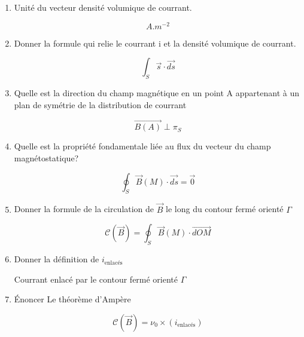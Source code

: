 \begin{enumerate}[label=\arabic{enumi} - , left=0pt, itemsep=1em]
    \item Unité du vecteur densité volumique de courrant.\par
    \begin{solution}
         \[ A.m^{-2} \]
    \end{solution}

    \item Donner la formule qui relie le courrant i et la densité volumique de courrant.\par
    \begin{solution}
         \[ \int_S \vec{s} \cdot \vec{ds} \]
    \end{solution}

    \item Quelle est la direction du champ magnétique en un point A appartenant à un plan de symétrie de la distribution de courrant  \par
    \begin{solution}
         \[ \vec{B(A)} \perp \pi_S \]
    \end{solution}


    \item Quelle est la propriété fondamentale liée au flux du vecteur du champ magnétostatique?\par 
    \begin{solution}
         \[ \oint_S \vec{B}(M) \cdot \vec{ds} = \vec{0} \]
    \end{solution}

    \item Donner la formule de la circulation de $\vec{B}$ le long du contour fermé orienté $\Gamma$\par
    \begin{solution}
         \[ \mathscr{C}(\vec{B}) = \oint_S \vec{B}(M) \cdot \vec{dOM} \]
    \end{solution}

    \item Donner la définition de $i_{\text{enlacés}}$ \par
    \begin{solution}
         Courrant enlacé par le contour fermé orienté $\Gamma$
    \end{solution}

    \item Énoncer Le théorème d'Ampère \par
    \begin{solution}
         \[ \mathscr{C}(\vec{B}) = \nu_0 \times (i_{\text{enlacés}})\]
    \end{solution}
    

\end{enumerate}
